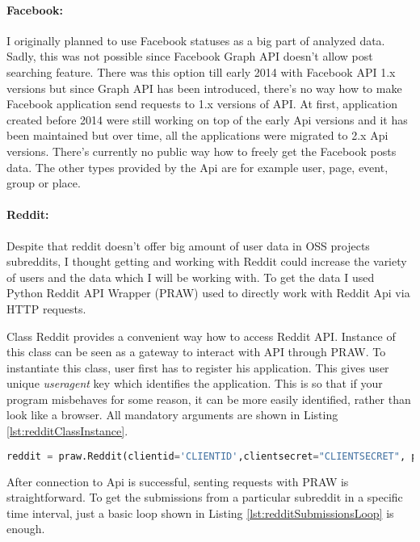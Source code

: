 \paragraph{Facebook:}
I originally planned to use Facebook statuses as a big part of analyzed data. Sadly, this was not possible since Facebook Graph API doesn't allow post searching feature. There was this option till early 2014 with Facebook API 1.x versions but since Graph API has been introduced, there's no way how to make Facebook application send requests to 1.x versions of API. At first, application created before 2014 were still working on top of the early Api versions and it has been maintained but over time, all the applications were migrated to 2.x Api versions. There's currently no public way how to freely get the Facebook posts data. The other types provided by the Api are for example user, page, event, group or place.

\paragraph{Reddit:}
Despite that reddit doesn't offer big amount of user data in OSS projects subreddits, I thought getting and working with Reddit could increase the variety of users and the data which I will be working with. To get the data I used Python Reddit API Wrapper (PRAW) used to directly work with Reddit Api via HTTP requests.

Class Reddit provides a convenient way how to access Reddit API. Instance of this class can be seen as a gateway to interact with API through PRAW. To instantiate this class, user first has to register his application. This gives user unique \textit{useragent} key which identifies the application. This is so that if your program misbehaves for some reason, it can be more easily identified, rather than look like a browser. All mandatory arguments are shown in Listing \ref{lst:redditClassInstance}.

\begin{lstlisting}[caption={Instantiating Reddit class object},label={lst:redditClassInstance},language=Python]
reddit = praw.Reddit(clientid='CLIENTID',clientsecret="CLIENTSECRET", password='PASSWORD',useragent='USERAGENT',username='USERNAME')
\end{lstlisting}

After connection to Api is successful, senting requests with PRAW is straightforward. To get the submissions from a particular subreddit in a specific time interval, just a basic loop shown in Listing \ref{lst:redditSubmissionsLoop} is enough.

